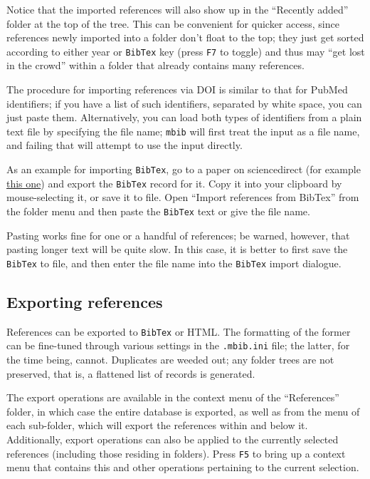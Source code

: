 \documentclass[10pt]{article}
\newcommand*{\mbib}{\texttt{mbib}\xspace}
\newcommand*{\bibtex}{\texttt{BibTex}\xspace}
\newcommand*{\key}[1]{\texttt{#1}\xspace}
\begin{document}
Notice that the imported references will also show up in the ``Recently added'' folder at the top of the tree. This can be convenient for quicker access, since references newly imported into a folder don't float to the top; they just get sorted according to either year or \bibtex key (press \key{F7} to toggle) and thus may ``get lost in the crowd'' within a folder that already contains many references.

The procedure for importing references via DOI is similar to that for PubMed identifiers; if you have a list of such identifiers, separated by white space, you can just paste them. Alternatively, you can load both types of identifiers from a plain text file by specifying the file name; \mbib will first treat the input as a file name, and failing that will attempt to use the input directly. 
 
As an example for importing \bibtex, go to a paper on 
sciencedirect (for example \href{https://doi.org/10.1016/j.bbamem.2014.05.014}{this one}) and export the \bibtex record for it. Copy it into your clipboard by mouse-selecting it, or save it to file. Open ``Import references from BibTex'' from the folder menu and then paste the \bibtex text or give the file name. 

Pasting works fine for one or a handful of references;  be warned, however, that pasting longer text will be quite slow. In this case, it is better to first save the \bibtex to file, and then enter the file name into the \bibtex import dialogue. 

\subsection{Exporting references}


References can be exported to \bibtex or HTML. The formatting of the former can be fine-tuned through various settings in the \texttt{.mbib.ini} file; the latter, for the time being, cannot. Duplicates are weeded out; any folder trees are not preserved, that is, a flattened list of records is generated. 

The export operations are available in the context menu of the ``References'' folder, in which case the entire database is exported, as well as from the menu of each sub-folder, which will export the references within and below it. Additionally, export operations can also be applied to the currently selected references (including those residing in folders). Press \key{F5} to bring up a context menu that contains this and other operations pertaining to the current selection.
\end{document}
